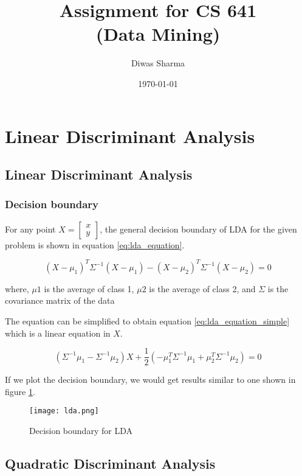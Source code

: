 \documentclass{article}
\title{Assignment for CS 641 \\ (Data Mining)}
\author{Diwas Sharma}
\date{\today}
\begin{document}
\maketitle
\newpage

\section{Linear Discriminant Analysis}

\subsection{Linear Discriminant Analysis}
\subsubsection{Decision boundary}
For any point $X = \begin{bmatrix}x \\ y\end{bmatrix}$, the general decision boundary of LDA for the given problem is shown in
equation \ref{eq:lda_equation}.

\begin{equation}
    \label{eq:lda_equation}
    (X-\mu_{1})^{T}\Sigma^{-1}(X - \mu_{1}) - (X-\mu_{2})^{T}\Sigma^{-1}(X - \mu_{2}) = 0
\end{equation}

where, $\mu{1}$ is the average of class 1,
$\mu{2}$ is the average of class 2, and
$\Sigma$ is the covariance matrix of the data

The equation can be simplified to obtain equation \ref{eq:lda_equation_simple} which is a linear
equation in $X$.

\begin{equation}
    \label{eq:lda_equation_simple}
    (\Sigma^{-1}\mu_{1} -  \Sigma^{-1}\mu_{2}) X + \frac{1}{2}(-\mu^{T}_{1}\Sigma^{-1}\mu_{1} + \mu^{T}_{2}\Sigma^{-1}\mu_{2}) = 0
\end{equation}

If we plot the decision boundary, we would get results similar to one
shown in figure \ref{fig:lda_decision_boundary}.


\begin{figure}[!ht]
  \texttt{[image: lda.png]}
  \caption{Decision boundary for LDA}
  \label{fig:lda_decision_boundary}
\end{figure}

\subsection{Quadratic Discriminant Analysis}
\end{document}
